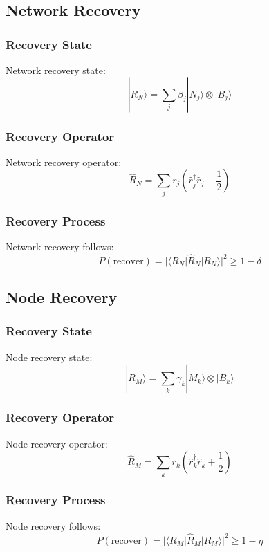 \documentclass[12pt]{article}
\begin{document}
\subsection{Network Recovery}
\subsubsection{Recovery State}
Network recovery state:
\begin{equation}
|R_N\rangle = \sum_j \beta_j|N_j\rangle \otimes |B_j\rangle
\end{equation}
\subsubsection{Recovery Operator}
Network recovery operator:
\begin{equation}
\hat{R}_N = \sum_j r_j(\hat{r}_j^\dagger\hat{r}_j + \frac{1}{2})
\end{equation}
\subsubsection{Recovery Process}
Network recovery follows:
\begin{equation}
P(\text{recover}) = |\langle R_N|\hat{R}_N|R_N\rangle|^2 \geq 1 - \delta
\end{equation}
\subsection{Node Recovery}
\subsubsection{Recovery State}
Node recovery state:
\begin{equation}
|R_M\rangle = \sum_k \gamma_k|M_k\rangle \otimes |B_k\rangle
\end{equation}
\subsubsection{Recovery Operator}
Node recovery operator:
\begin{equation}
\hat{R}_M = \sum_k r_k(\hat{r}_k^\dagger\hat{r}_k + \frac{1}{2})
\end{equation}
\subsubsection{Recovery Process}
Node recovery follows:
\begin{equation}
P(\text{recover}) = |\langle R_M|\hat{R}_M|R_M\rangle|^2 \geq 1 - \eta
\end{equation}
\end{document}
